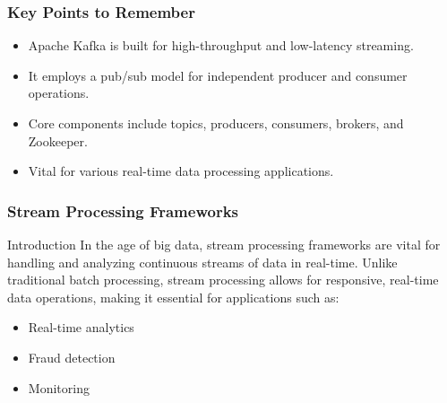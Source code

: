 \documentclass[aspectratio=169]{beamer}
\begin{document}
\begin{frame}[fragile]
    \frametitle{Key Points to Remember}
    \begin{itemize}
        \item Apache Kafka is built for high-throughput and low-latency streaming.
        \item It employs a pub/sub model for independent producer and consumer operations.
        \item Core components include topics, producers, consumers, brokers, and Zookeeper.
        \item Vital for various real-time data processing applications.
    \end{itemize}
\end{frame}

\begin{frame}
    \frametitle{Stream Processing Frameworks}
    \begin{block}{Introduction}
        In the age of big data, stream processing frameworks are vital for handling and analyzing continuous streams of data in real-time. Unlike traditional batch processing, stream processing allows for responsive, real-time data operations, making it essential for applications such as:
        \begin{itemize}
            \item Real-time analytics
            \item Fraud detection
            \item Monitoring
        \end{itemize}
    \end{block}
\end{frame}
\end{document}
